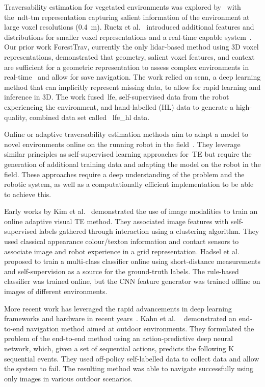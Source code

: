 Traversability estimation for vegetated environments was explored by~\cite{ahtiainen2017normal} with the~\ac{ndt-tm} representation capturing salient information of the environment at large voxel resolutions (0.4~\si{m}). Ruetz et al.~\cite{ruetz2022FTM} introduced additional features and distributions for smaller voxel representations and a real-time capable system~\cite{ruetz2024foresttrav}. Our prior work ForestTrav, currently the only lidar-based method using 3D voxel representations, demonstrated that geometry, salient voxel features, and context are sufficient for a geometric representation to assess complex environments in real-time~\cite{ruetz2024foresttrav} and allow for save navigation. The work relied on \ac{scnn}, a deep learning method that can implicitly represent missing data, to allow for rapid learning and inference in 3D.  The work fused~\ac{lfe}, self-supervised data from the robot experiencing the environment, and hand-labelled (HL) data to generate a high-quality, combined data set called ~\ac{lfe_hl} data. 

Online or adaptive traversability estimation methods aim to adapt a model to novel environments online on the running robot in the field~\cite{wellington2004online, frey2023fast, kim2006traversability, hadsell2009learning, kahn2020badgr}. They leverage similar principles as self-supervised learning approaches for~\ac{TE} but require the generation of additional training data and adapting the model on the robot in the field. These approaches require a deep understanding of the problem and the robotic system, as well as a computationally efficient implementation to be able to achieve this.

Early works by Kim et al.~\cite{kim2006traversability} demonstrated the use of image modalities to train an online adaptive visual \ac{TE} method. They associated image features with self-supervised labels gathered through interaction using a clustering algorithm. They used classical appearance colour/texton information and contact sensors to associate image and robot experience in a grid representation. Hadsel et al. ~\cite{hadsell2009learning} proposed to train a multi-class classifier online using short-distance measurements and self-supervision as a source for the ground-truth labels. The rule-based classifier was trained online, but the CNN feature generator was trained offline on images of different environments. 

More recent work has leveraged the rapid advancements in deep learning frameworks and hardware in recent years~\cite{kahn2020badgr,frey2023fast,yoon2024adaptive}. 
%
Kahn et al. ~\cite{kahn2020badgr} demonstrated an end-to-end navigation method aimed at outdoor environments. They formulated the problem of the end-to-end method using an action-predictive deep neural network, which, given a set of sequential actions, predicts the following K sequential events. They used off-policy self-labelled data to collect data and allow the system to fail. The resulting method was able to navigate successfully using only images in various outdoor scenarios.


